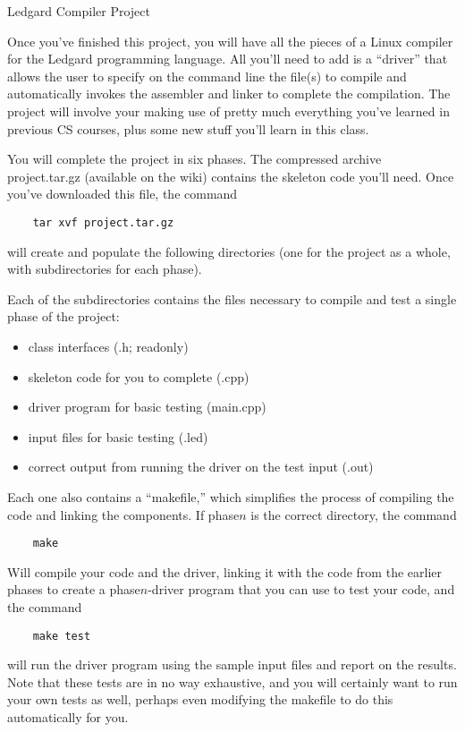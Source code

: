 \documentclass{article}
\begin{document}
\begin{center}
    {\huge Ledgard Compiler Project}
\end{center}
\hrulefill

Once you've finished this project, you will have all the pieces of
a Linux compiler for the Ledgard programming language. All you'll need
to add is a ``driver'' that allows the user to specify on the command
line the file(s) to compile and automatically invokes the assembler
and linker to complete the compilation. The project will involve your
making use of pretty much everything you've learned in previous CS
courses, plus some new stuff you'll learn in this class.

You will complete the project in six phases. The compressed archive
project.tar.gz (available on the wiki) contains
the skeleton code you'll need. Once you've downloaded this file, the
command 
\begin{verbatim}
    tar xvf project.tar.gz 
\end{verbatim}
will create and populate the following directories (one for the
project as a whole, with subdirectories for each phase).

Each of the subdirectories contains the files necessary to compile and
test a single phase of the project:
\begin{itemize}
    \item class interfaces (.h; readonly)
    \item skeleton code for you to complete (.cpp)
    \item driver program for basic testing (main.cpp)
    \item input files for basic testing (.led)
    \item correct output from running the driver on the test input
        (.out)
\end{itemize}

Each one also contains a ``makefile,'' which simplifies the process of
compiling the code and linking the components.  If phase$n$ is the
correct directory, the command
\begin{verbatim}
    make
\end{verbatim}
Will compile your code and the driver, linking it with the code from
the earlier phases to create a phase$n$-driver program that you can
use to test your code, and the command
\begin{verbatim}
    make test
\end{verbatim}
will run the driver program using the sample input files and report on
the results.  Note that these tests are in no way exhaustive, and you
will certainly want to run your own tests as well, perhaps even
modifying the makefile to do this automatically for you.
\end{document}

